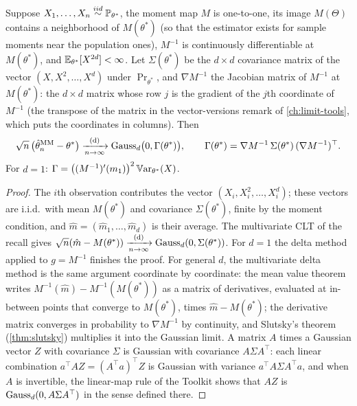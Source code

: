 \begin{theorem}
\label{thm:mom-normal}
Suppose $X_1, \ldots, X_n \stackrel{iid}{\sim} \mathbb{P}_{\theta^*}$, the moment map $M$ is one-to-one, its image $M(\Theta)$ contains a neighborhood of $M(\theta^*)$ (so that the estimator exists for sample moments near the population ones), $M^{-1}$ is continuously differentiable at $M(\theta^*)$, and $\operatorname*{\mathbb{E}}_{\theta^*}[X^{2d}] < \infty$.
Let $\Sigma(\theta^*)$ be the $d \times d$ covariance matrix of the vector $(X, X^2, \ldots, X^d)$ under $\Pr_{\theta^*}$, and $\nabla M^{-1}$ the Jacobian matrix of $M^{-1}$ at $M(\theta^*)$: the $d \times d$ matrix whose row $j$ is the gradient of the $j$th coordinate of $M^{-1}$ (the transpose of the matrix in the vector-versions remark of \cref{ch:limit-tools}, which puts the coordinates in columns).
Then
\[
\sqrt{n}\,\big(\hat{\theta}_n^{\text{MM}} - \theta^*\big) \xrightarrow [n \to \infty ]{\text{(d)}} \text{Gauss}_d\big(0, \Gamma(\theta^*)\big), \qquad \Gamma(\theta^*) = \nabla M^{-1}\,\Sigma(\theta^*)\,(\nabla M^{-1})^\top.
\]
For $d = 1$: $\Gamma = \big((M^{-1})'(m_1)\big)^2 \operatorname*{\mathbb{V}\text{ar}}_{\theta^*}(X)$.
\end{theorem}

\begin{proof}
The $i$th observation contributes the vector $(X_i, X_i^2, \ldots, X_i^d)$; these vectors are i.i.d.\ with mean $M(\theta^*)$ and covariance $\Sigma(\theta^*)$, finite by the moment condition, and $\hat{m} = (\hat{m}_1, \ldots, \hat{m}_d)$ is their average.
The multivariate CLT of the recall gives $\sqrt{n}(\hat{m} - M(\theta^*)) \xrightarrow [n \to \infty ]{\text{(d)}} \text{Gauss}_d(0, \Sigma(\theta^*))$.
For $d = 1$ the delta method applied to $g = M^{-1}$ finishes the proof.
For general $d$, the multivariate delta method is the same argument coordinate by coordinate: the mean value theorem writes $M^{-1}(\hat{m}) - M^{-1}(M(\theta^*))$ as a matrix of derivatives, evaluated at in-between points that converge to $M(\theta^*)$, times $\hat{m} - M(\theta^*)$; the derivative matrix converges in probability to $\nabla M^{-1}$ by continuity, and Slutsky's theorem (\cref{thm:slutsky}) multiplies it into the Gaussian limit.
A matrix $A$ times a Gaussian vector $Z$ with covariance $\Sigma$ is Gaussian with covariance $A\Sigma A^\top$: each linear combination $a^\top AZ = (A^\top a)^\top Z$ is Gaussian with variance $a^\top A \Sigma A^\top a$, and when $A$ is invertible, the linear-map rule of the Toolkit  shows that $AZ$ is $\text{Gauss}_d(0, A\Sigma A^\top)$ in the sense defined there.
\end{proof}

